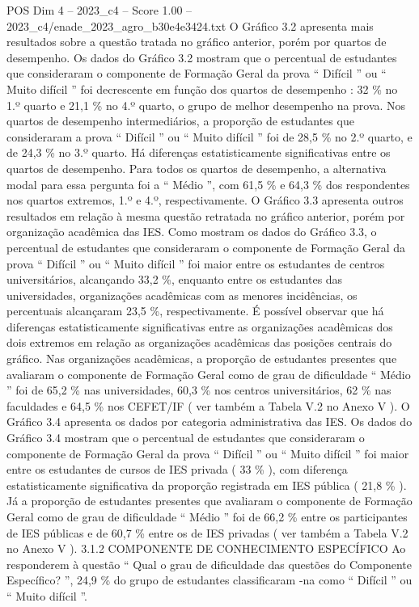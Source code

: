 \begin{textsample}{POS Dim 4 – 2023\_c4 – Score 1.00 – 2023\_c4/enade\_2023\_agro\_b30e4e3424.txt}
O Gráfico 3.2 apresenta mais resultados sobre a questão tratada no gráfico anterior, porém por quartos de desempenho.
Os dados do Gráfico 3.2 mostram que o percentual de estudantes que consideraram o componente de Formação Geral da prova “ Difícil ” ou “ Muito difícil ” foi decrescente em função dos quartos de desempenho : 32 \% no 1.º quarto e 21,1 \% no 4.º quarto, o grupo de melhor desempenho na prova.
Nos quartos de desempenho intermediários, a proporção de estudantes que consideraram a prova “ Difícil ” ou “ Muito difícil ” foi de 28,5 \% no 2.º quarto, e de 24,3 \% no 3.º quarto.
Há diferenças estatisticamente significativas entre os quartos de desempenho.
Para todos os quartos de desempenho, a alternativa modal para essa pergunta foi a “ Médio ”, com 61,5 \% e 64,3 \% dos respondentes nos quartos extremos, 1.º e 4.º, respectivamente.
O Gráfico 3.3 apresenta outros resultados em relação à mesma questão retratada no gráfico anterior, porém por organização acadêmica das IES.
Como mostram os dados do Gráfico 3.3, o percentual de estudantes que consideraram o componente de Formação Geral da prova “ Difícil ” ou “ Muito difícil ” foi maior entre os estudantes de centros universitários, alcançando 33,2 \%, enquanto entre os estudantes das universidades, organizações acadêmicas com as menores incidências, os percentuais alcançaram 23,5 \%, respectivamente.
É possível observar que há diferenças estatisticamente significativas entre as organizações acadêmicas dos dois extremos em relação as organizações acadêmicas das posições centrais do gráfico.
Nas organizações acadêmicas, a proporção de estudantes presentes que avaliaram o componente de Formação Geral como de grau de dificuldade “ Médio ” foi de 65,2 \% nas universidades, 60,3 \% nos centros universitários, 62 \% nas faculdades e 64,5 \% nos CEFET/IF ( ver também a Tabela V.2 no Anexo V ).
O Gráfico 3.4 apresenta os dados por categoria administrativa das IES.
Os dados do Gráfico 3.4 mostram que o percentual de estudantes que consideraram o componente de Formação Geral da prova “ Difícil ” ou “ Muito difícil ” foi maior entre os estudantes de cursos de IES privada ( 33 \% ), com diferença estatisticamente significativa da proporção registrada em IES pública ( 21,8 \% ).
Já a proporção de estudantes presentes que avaliaram o componente de Formação Geral como de grau de dificuldade “ Médio ” foi de 66,2 \% entre os participantes de IES públicas e de 60,7 \% entre os de IES privadas ( ver também a Tabela V.2 no Anexo V ). 3.1.2 COMPONENTE DE CONHECIMENTO ESPECÍFICO Ao responderem à questão “ Qual o grau de dificuldade das questões do Componente Específico? ”, 24,9 \% do grupo de estudantes classificaram -na como “ Difícil ” ou “ Muito difícil ”.

\end{textsample}
